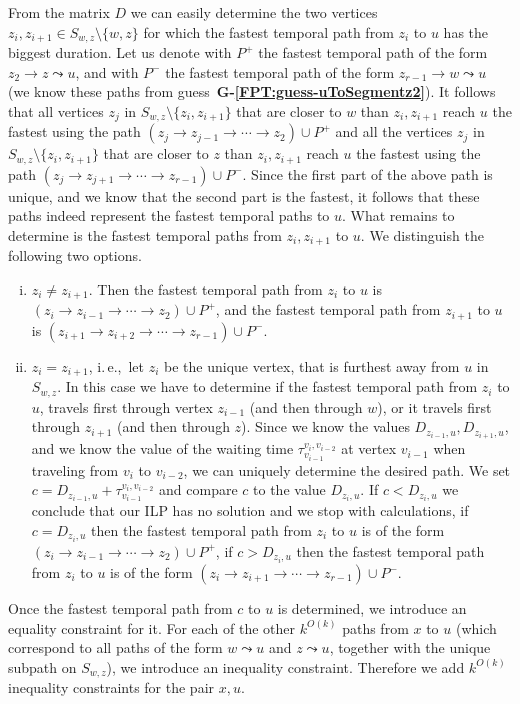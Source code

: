 \documentclass[a4paper,UKenglish,cleveref, autoref, thm-restate]{lipics-v2021}
\newcommand{\ie}{i.\,e.,\ }
\begin{document}
From the matrix $D$ we can easily determine the two vertices $z_i, z_{i+1} \in S_{w,z}\setminus\{w,z\}$ for which the fastest temporal path from $z_i$ to $u$ has the biggest duration.
Let us denote with $P^+$ the fastest temporal path of the form $z_2 \rightarrow z \leadsto u$,
and with $P^-$ the fastest temporal path of the form $z_{r-1} \rightarrow w \leadsto u$ 
(we know these paths from guess~\textcolor{lipicsGray}{\textsf{\textbf{G-\ref{FPT:guess-uToSegmentz2}}}}).
%
It follows that all vertices $z_j$ in $S_{w,z} \setminus\{z_i,z_{i+1}\}$ that are closer to $w$ than $z_i,z_{i+1}$ reach $u$ the fastest using the path $(z_j \rightarrow z_{j-1} \rightarrow \cdots \rightarrow z_2) \cup P^+$ 
and
all the vertices $z_j$ in $S_{w,z}\setminus\{z_i,z_{i+1}\}$ that are closer to $z$ than $z_i, z_{i+1}$ reach $u$ the fastest using the path
$(z_j \rightarrow z_{j+1} \rightarrow \cdots \rightarrow z_{r-1}) \cup P^-$.
Since the first part of the above path is unique, and we know that the second part is the fastest, it follows that these paths indeed represent the fastest temporal paths to $u$.
%
What remains to determine is the fastest temporal paths from $z_i,z_{i+1}$ to $u$.
We distinguish the following two options.
\begin{enumerate}[(i)]
    \item \label{FPT:equality-fromUtoX-twosplit}
    $z_i \neq z_{i+1}$.
    Then the fastest temporal path from $z_i$ to $u$ is 
    $(z_i \rightarrow z_{i-1} \rightarrow \cdots \rightarrow z_2) \cup P^+$,
    and 
    the fastest temporal path from $z_{i+1}$ to $u$ is 
    $(z_{i+1} \rightarrow z_{i+2} \rightarrow \cdots \rightarrow z_{r-1}) \cup P^-$.
    \item \label{FPT:equality-fromUtoX-onesplit}
    $z_i = z_{i+1}$, \ie let $z_i$ be the unique vertex, that is furthest away from $u$ in $S_{w,z}$.
    In this case we have to determine if the fastest temporal path from $z_i$ to $u$, travels first through vertex $z_{i-1}$ (and then through $w$),
    or it travels first through $z_{i+1}$ (and then through $z$).
    Since we know the values $D_{z_{i-1},u}, D_{z_{i+1},u}$,
    and we know the value of the waiting time $\tau_{v_{i-1}} ^{v_{i}, v_{i-2}}$ at vertex $v_{i-1}$ when traveling from $v_i$ to $v_{i-2}$, 
    we can uniquely determine the desired path.
    We set $c = D_{z_{i-1},u} +  \tau_{v_{i-1}} ^{v_{i}, v_{i-2}}$
    and compare $c$ to the value $D_{z_{i},u}$.
    If $c < D_{z_{i},u}$ we conclude that our ILP has no solution and we stop with calculations,
    if $c = D_{z_{i},u}$ then the fastest temporal path from $z_i$ to $u$ is of the form $(z_i \rightarrow z_{i-1} \rightarrow \cdots \rightarrow z_2) \cup P^+$,
    if $c > D_{z_{i},u}$ then the fastest temporal path from $z_i$ to $u$ is of the form $(z_i \rightarrow z_{i+1} \rightarrow \cdots \rightarrow z_{r-1}) \cup P^-$.
\end{enumerate}
Once the fastest temporal path from $c$ to $u$ is determined, we introduce an equality constraint for it.
For each of the other $k^{O(k)}$ paths from $x$ to $u$ (which correspond to all paths of the form $w \leadsto u$ and $z \leadsto u$, together with the unique subpath on $S_{w,z}$),
we introduce an inequality constraint. Therefore we add $k^{O(k)}$ inequality constraints for the pair $x,u$.
\end{document}

